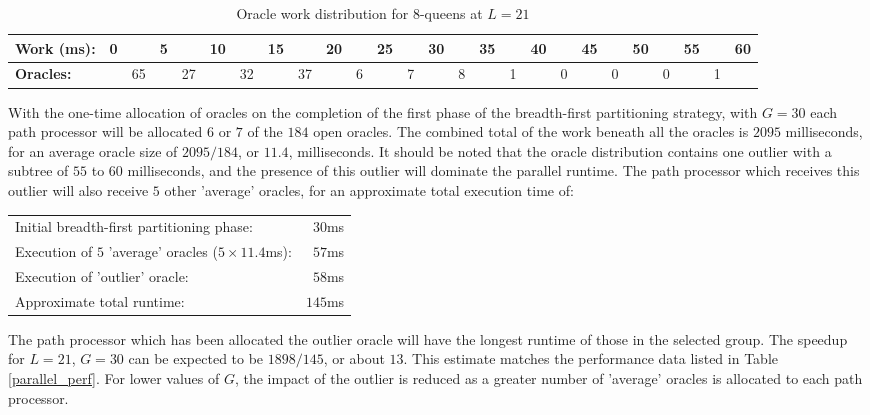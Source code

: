 \begin{table}[htb]
{\small
\begin{tabular}{| l | r @{} r @{} r @{} r @{} r @{} r @{} r @{} r @{}
    r @{} r @{} r @{} r @{} r @{} r @{} r @{} r @{} r @{} r @{} r @{} 
    r @{} r @{} r @{} r @{} r @{} r |}
\hline
\textbf{Work (ms):} & 0 & & 5 & & 10 & & 15 & & 20 & & 25 & & 30 & & 35 & & 40
     & & 45 & & 50 & & 55 & & 60 \\
\hline
\textbf{Oracles:} & & 65 & & 27 & & 32 & & 37 & & 6 & & 7 & & 8 & & 1
   & & 0 & & 0 & & 0 & & 1 &\\
\hline
\end{tabular}
}
\caption{Oracle work distribution for 8-queens at $L=21$}
\label{q8_orcs}
\end{table}

With the one-time allocation of oracles on the completion of the first phase of
the breadth-first partitioning strategy, with $G=30$ each path processor will be
 allocated $6$ or $7$ of the $184$ open oracles.  The combined total of the work beneath
all the oracles is $2095$ milliseconds, for an average oracle size of $2095/184$, or
$11.4$, milliseconds.  It should be noted that the oracle distribution contains one
outlier with a subtree of $55$ to $60$ milliseconds, and the presence of this outlier
will dominate the parallel runtime.  The path processor which receives this outlier will
also receive $5$ other 'average' oracles, for an approximate total execution time of:

\begin{tabular}{l r}
Initial breadth-first partitioning phase:               & $30$ms  \\
Execution of $5$ 'average' oracles ($5 \times 11.4$ms): & $57$ms  \\
Execution of 'outlier' oracle:                          & $58$ms  \\
Approximate total runtime:                              & $145$ms \\
\end{tabular}

The path processor which has been allocated the outlier oracle will
have the longest runtime of those in the selected group.  The speedup
for $L=21$, $G=30$ can be expected to be $1898/145$, or about $13$.  This
estimate matches the performance data listed in Table \ref{parallel_perf}.
For lower values of $G$, the impact of the outlier is reduced as a
greater number of 'average' oracles is allocated to each path processor.

